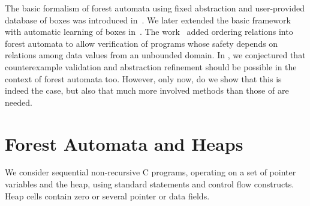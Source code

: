 {The basic formalism of forest automata using fixed abstraction and
user-provided database of boxes was introduced in~\cite{forester12}.
We later extended the basic framework with automatic learning of boxes
in~\cite{boxes13}.
The work~\cite{forester-data-acta} added ordering relations into forest
automata to allow verification of
programs whose safety depends on relations among data values
from an unbounded domain.
In \cite{forester12,boxes13}, we conjectured that counterexample validation and
abstraction refinement should be possible in the context of forest
automata too. However, only now, do we show that this is indeed the case, but also that much
more involved methods than those of \cite{artmc} are needed.

\section{Forest Automata and Heaps}


We consider sequential non-recursive C programs, operating on a set of pointer
variables and the heap, using standard statements and control flow constructs.
Heap cells contain zero or several pointer or data fields.

%

}
